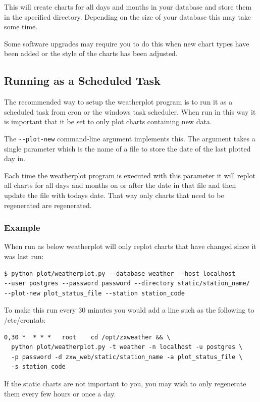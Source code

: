 \documentclass[a4paper,10pt,draft]{book}
\begin{document}
This will create charts for all days and months in your database and store them in the specified directory. Depending on the size of your database this may take some time.

Some software upgrades may require you to do this when new chart types have been added or the style of the charts has been adjusted.

\subsection{Running as a Scheduled Task}

The recommended way to setup the weatherplot program is to run it as a scheduled task from cron or the windows task scheduler. When run in this way it is important that it be set to only plot charts containing new data.

The \verb|--plot-new| command-line argument implements this. The argument takes a single parameter which is the name of a file to store the date of the last plotted day in.

Each time the weatherplot program is executed with this parameter it will replot all charts for all days and months on or after the date in that file and then update the file with todays date. That way only charts that need to be regenerated are regenerated.

\subsubsection{Example}

When run as below weatherplot will only replot charts that have changed since it was last run:
\begin{verbatim}
$ python plot/weatherplot.py --database weather --host localhost
--user postgres --password password --directory static/station_name/
--plot-new plot_status_file --station station_code
\end{verbatim}

To make this run every 30 minutes you would add a line such as the following to /etc/crontab:
\begin{verbatim}
0,30 *  * * *   root    cd /opt/zxweather && \
  python plot/weatherplot.py -t weather -n localhost -u postgres \
  -p password -d zxw_web/static/station_name -a plot_status_file \
  -s station_code
\end{verbatim}

If the static charts are not important to you, you may wish to only regenerate them every few hours or once a day.
\end{document}
